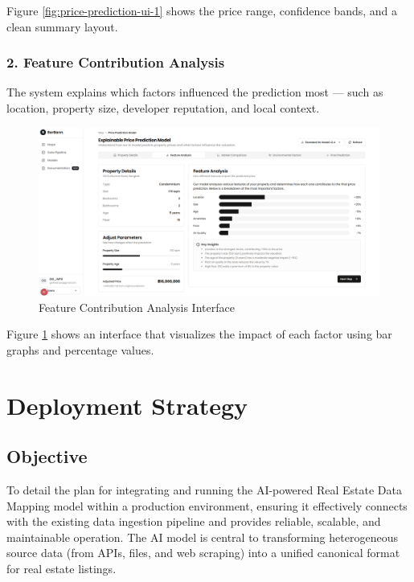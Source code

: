 Figure \ref{fig:price-prediction-ui-1} shows the price range, confidence bands, and a clean summary layout.

\subsubsection*{2. Feature Contribution Analysis}

The system explains which factors influenced the prediction most — such as location, property size, developer reputation, and local context.

\begin{figure}[htbp]
	\centering
	\includegraphics[width=1\textwidth]{assets/ai/price-prediction-2.png}
	\caption{Feature Contribution Analysis Interface}
	\label{fig:price-prediction-ui-2}
\end{figure}

Figure \ref{fig:price-prediction-ui-2} shows an interface that visualizes the impact of each factor using bar graphs and percentage values.


\section{Deployment Strategy}
\label{sec:deployment_strategy}

\subsection{Objective}
To detail the plan for integrating and running the AI-powered Real Estate Data Mapping model within a production environment, ensuring it effectively connects with the existing data ingestion pipeline and provides reliable, scalable, and maintainable operation. The AI model is central to transforming heterogeneous source data (from APIs, files, and web scraping) into a unified canonical format for real estate listings.

